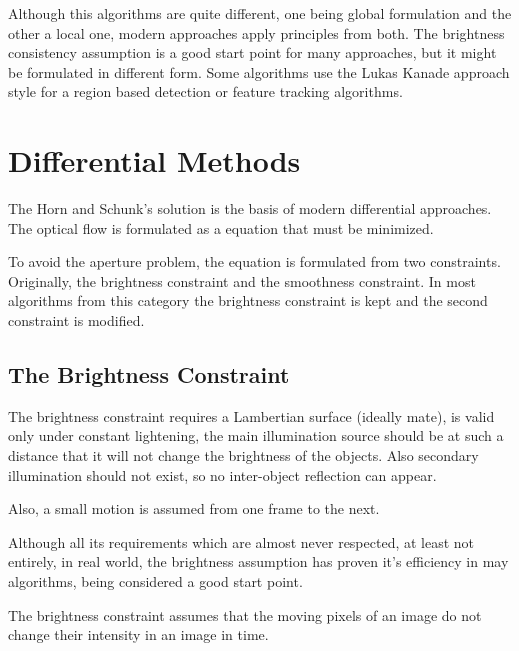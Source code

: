 \documentclass[12pt,a4paper,twoside]{report}
\begin{document}
Although this algorithms are quite different, one being global formulation and the other a local one, modern approaches apply principles from both. The brightness consistency assumption is a good start point for many approaches, but it might be formulated in different form. Some algorithms use the Lukas Kanade approach style for a region based detection or feature tracking algorithms.




\section{Differential Methods}
The Horn and Schunk's solution is the basis of modern differential approaches. The optical flow is formulated as a equation that must be minimized.

To avoid the aperture problem, the equation is formulated from two constraints. Originally, the brightness constraint and the smoothness constraint. In most algorithms from this category the brightness constraint is kept and the second constraint is modified.
\subsection{The Brightness Constraint} \label{BrightnessConstr}

The brightness constraint requires a Lambertian surface (ideally mate), is valid only under constant lightening, the main illumination source should be at such a distance that it will not change the brightness of the objects. Also secondary illumination should not exist, so no inter-object reflection can appear.

 Also, a small motion is assumed from one frame to the next. 
 
Although all its  requirements which are almost never respected, at least not entirely, in real world, the brightness assumption has proven it's efficiency in may algorithms, being considered a good start point.

The brightness constraint assumes that the moving pixels of an image do not change their intensity in an image in time.
\end{document}
